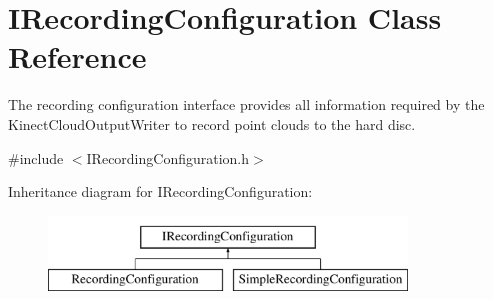 \hypertarget{class_i_recording_configuration}{}\section{I\+Recording\+Configuration Class Reference}
\label{class_i_recording_configuration}


The recording configuration interface provides all information required by the Kinect\+Cloud\+Output\+Writer to record point clouds to the hard disc.  




{\ttfamily \#include $<$I\+Recording\+Configuration.\+h$>$}

Inheritance diagram for I\+Recording\+Configuration\+:\begin{figure}[H]
\begin{center}
\leavevmode
\includegraphics[height=2.000000cm]{class_i_recording_configuration}
\end{center}
\end{figure}
